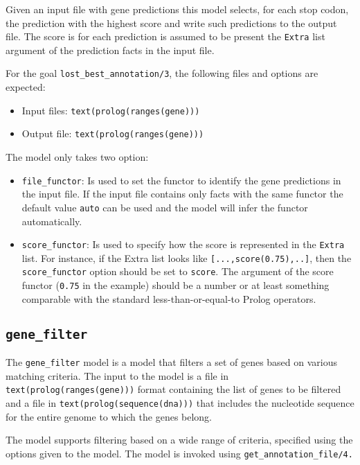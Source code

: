 \documentclass{book}
\begin{document}
Given an input file with gene predictions this model selects, for each
stop codon, the prediction with the highest score and write such
predictions to the output file. The score is for each prediction is
assumed to be present the \texttt{Extra} list argument of the
prediction facts in the input file. 

For the goal \texttt{lost\_best\_annotation/3}, the following files
and options are expected:
\begin{itemize}
\item Input files: \texttt{text(prolog(ranges(gene)))}
\item Output file: \texttt{text(prolog(ranges(gene)))}
\end{itemize}

The model only takes two option:

\begin{itemize} 
\item \texttt{file\_functor}: Is used to set the functor to
  identify the gene predictions in the input file. If the input file
  contains only facts with the same functor the default value
  \texttt{auto} can be used and the model will infer the functor
  automatically.
\item \texttt{score\_functor}: Is used to specify how the score is
  represented in the \texttt{Extra} list. For instance, if the Extra
  list looks like \verb|[...,score(0.75),..]|,  then the
  \texttt{score\_functor} option should be set to \texttt{score}.
  The argument of the score functor (\texttt{0.75} in the example)
  should be a number or at least something comparable with the
  standard less-than-or-equal-to Prolog operators.
\end{itemize}

\subsection{\texttt{gene\_filter}}

The \texttt{gene\_filter} model is a model that filters a set of genes
based on various matching criteria. The input to the model is 
a file in \texttt{text(prolog(ranges(gene)))} format containing the 
list of genes to be filtered and a file in
\texttt{text(prolog(sequence(dna)))} that includes the nucleotide
sequence for the entire genome to which the genes belong.

The model supports filtering based on a wide range of criteria,
specified using the options given to the model. The model 
is invoked using \texttt{get\_annotation\_file/4.}
\end{document}
